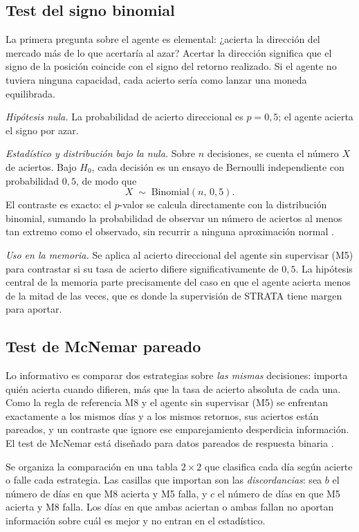 \subsection{Test del signo binomial}
\label{sec:tests-sign}

La primera pregunta sobre el agente es elemental: ¿acierta la dirección del mercado más de lo que acertaría al azar? Acertar la dirección significa que el signo de la posición coincide con el signo del retorno realizado. Si el agente no tuviera ninguna capacidad, cada acierto sería como lanzar una moneda equilibrada.

\emph{Hipótesis nula.} La probabilidad de acierto direccional es $p = 0{,}5$; el agente acierta el signo por azar.

\emph{Estadístico y distribución bajo la nula.} Sobre $n$ decisiones, se cuenta el número $X$ de aciertos. Bajo $H_0$, cada decisión es un ensayo de Bernoulli independiente con probabilidad $0{,}5$, de modo que
\[
X \;\sim\; \mathrm{Binomial}(n,\, 0{,}5).
\]
El contraste es exacto: el $p$-valor se calcula directamente con la distribución binomial, sumando la probabilidad de observar un número de aciertos al menos tan extremo como el observado, sin recurrir a ninguna aproximación normal \cite{conover1999}.

\emph{Uso en la memoria.} Se aplica al acierto direccional del agente sin supervisar (M5) para contrastar si su tasa de acierto difiere significativamente de $0{,}5$. La hipótesis central de la memoria parte precisamente del caso en que el agente acierta menos de la mitad de las veces, que es donde la supervisión de STRATA tiene margen para aportar.

\subsection{Test de McNemar pareado}
\label{sec:tests-mcnemar}

Lo informativo es comparar dos estrategias sobre \emph{las mismas} decisiones: importa quién acierta cuando difieren, más que la tasa de acierto absoluta de cada una. Como la regla de referencia M8 y el agente sin supervisar (M5) se enfrentan exactamente a los mismos días y a los mismos retornos, sus aciertos están pareados, y un contraste que ignore ese emparejamiento desperdicia información. El test de McNemar está diseñado para datos pareados de respuesta binaria \cite{mcnemar1947}.

Se organiza la comparación en una tabla $2\times 2$ que clasifica cada día según acierte o falle cada estrategia. Las casillas que importan son las \emph{discordancias}: sea $b$ el número de días en que M8 acierta y M5 falla, y $c$ el número de días en que M5 acierta y M8 falla. Los días en que ambas aciertan o ambas fallan no aportan información sobre cuál es mejor y no entran en el estadístico.

